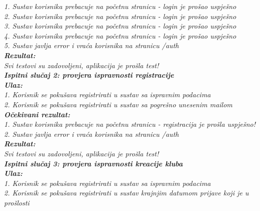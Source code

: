 			 \textit{1. Sustav korisnika prebacuje na početnu stranicu - login je prošao uspješno}\\
			 \textit{2. Sustav korisnika prebacuje na početnu stranicu - login je prošao uspješno}\\
			 \textit{3. Sustav korisnika prebacuje na početnu stranicu - login je prošao uspješno}\\
			 \textit{4. Sustav korisnika prebacuje na početnu stranicu - login je prošao uspješno}\\
			 \textit{5. Sustav javlja error i vraća korisnika na stranicu /auth}\\

			 \textbf{\textit{Rezultat:}}\\
			 \textit{Svi testovi su zadovoljeni, aplikacija je prošla test!}\\

			 \textbf{\textit{Ispitni slučaj 2: provjera ispravnosti registracije}}\\
			 \textbf{\textit{Ulaz:}}\\
			 
			  \textit{1. Korisnik se pokušava registrirati u sustav sa ispravnim podacima}\\
			  \textit{2. Korisnik se pokušava registrirati u sustav sa pogrešno unesenim mailom}\\
 
			  \textbf{\textit{Očekivani rezultat:}}\\
 
			  \textit{1. Sustav korisnika prebacuje na početnu stranicu - registracija je prošla uspješno!}\\
			  \textit{2. Sustav javlja error i vraća korisnika na stranicu /auth}\\
 
			  \textbf{\textit{Rezultat:}}\\
			  \textit{Svi testovi su zadovoljeni, aplikacija je prošla test!}\\

			  \textbf{\textit{Ispitni slučaj 3: provjera ispravnosti kreacije kluba}}\\
             \textbf{\textit{Ulaz:}}\\
             
              \textit{1. Korisnik se pokušava registrirati u sustav sa ispravnim podacima}\\
              \textit{2. Korisnik se pokušava registrirati u sustav krajnjim datumom prijave koji je u prošlosti}\\
 
